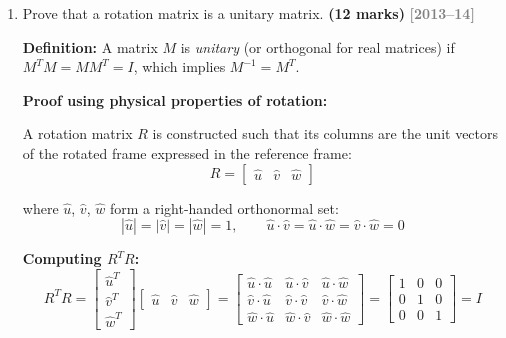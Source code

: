 \documentclass[12pt,a3paper]{article}
\newcommand{\yr}[1]{\hfill\textcolor{gray}{\small\textbf{[#1]}}}
\newcommand{\mk}[1]{\textcolor{orange!70!black}{\small\textbf{(#1 marks)}}}
\begin{document}
\begin{enumerate}
\begin{tcolorbox}[enhanced,breakable,ansbox,colback=cB!4,colframe=cB,
  boxrule=0.8pt,arc=5pt,
  title={\textbf{Answer}},fonttitle=\bfseries\color{white},
  colbacktitle=cB]
\[
 R_z(\theta) =
  \begin{bmatrix}
    \cos\theta&-\sin\theta&0\\ \sin\theta&\cos\theta&0\\ 0&0&1
  \end{bmatrix}
\]

\end{tcolorbox}

\item \label{qlabel:C2-Q6}
Prove that a rotation matrix is a unitary matrix. \mk{12}
\yr{2013--14}

\begin{tcolorbox}[enhanced,breakable,ansbox,colback=cB!4,colframe=cB,
  boxrule=0.8pt,arc=5pt,
  title={\textbf{Answer}},fonttitle=\bfseries\color{white},
  colbacktitle=cB]

\textbf{Definition:} A matrix $M$ is \emph{unitary} (or orthogonal for
real matrices) if $M^T M = M M^T = I$, which implies $M^{-1} = M^T$.

\medskip
\textbf{Proof using physical properties of rotation:}

A rotation matrix $R$ is constructed such that its columns are the
unit vectors of the rotated frame expressed in the reference frame:
\[
  R = \begin{bmatrix}\hat{u} & \hat{v} & \hat{w}\end{bmatrix}
\]

where $\hat{u}$, $\hat{v}$, $\hat{w}$ form a right-handed orthonormal
set:
\[
  |\hat{u}| = |\hat{v}| = |\hat{w}| = 1, \qquad
  \hat{u}\cdot\hat{v} = \hat{u}\cdot\hat{w} = \hat{v}\cdot\hat{w} = 0
\]

\textbf{Computing $R^T R$:}
\[
  R^TR =
  \begin{bmatrix}\hat{u}^T\\\hat{v}^T\\\hat{w}^T\end{bmatrix}
  \begin{bmatrix}\hat{u} & \hat{v} & \hat{w}\end{bmatrix}
  =
  \begin{bmatrix}
    \hat{u}\cdot\hat{u} & \hat{u}\cdot\hat{v} & \hat{u}\cdot\hat{w}\\
    \hat{v}\cdot\hat{u} & \hat{v}\cdot\hat{v} & \hat{v}\cdot\hat{w}\\
    \hat{w}\cdot\hat{u} & \hat{w}\cdot\hat{v} & \hat{w}\cdot\hat{w}
  \end{bmatrix}
  =
  \begin{bmatrix}1&0&0\\0&1&0\\0&0&1\end{bmatrix} = I
\]


\end{tcolorbox}
\end{enumerate}
\end{document}
